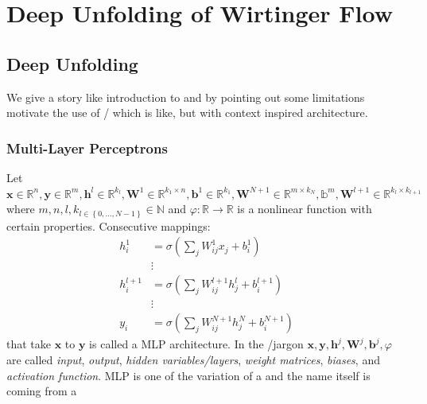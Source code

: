 \chapter{Deep Unfolding of Wirtinger Flow}\label{ch:deep_unfolding_of_wirtinger_flows}



\section{Deep Unfolding}

We give a story like introduction to \dl\cite{Goodfellow2016} and by pointing out some \dl limitations motivate the use of \du/\au\cite{Monga2019} 
which is \dl like, but with context inspired architecture.

\subsection{Multi-Layer Perceptrons}
Let $\boldsymbol{x} \in \mathbb{R}^n,\boldsymbol{y} \in \mathbb{R}^m, \boldsymbol{h}^l \in \mathbb{R}^{k_l}, \boldsymbol{W}^1 \in \mathbb{R}^{k_1 \times n}
, \boldsymbol{b}^1 \in \mathbb{R}^{k_1}, \boldsymbol{W}^{N+1} \in \mathbb{R}^{m \times k_N}, \mathbb{b}^m,\boldsymbol{W}^{l+1} \in \mathbb{R}^{k_l \times k_{l+1}}$ 
where $m,n,l,k_{l\in \left\{0,\ldots,N-1\right\}} \in \mathbb{N}$ and $\varphi \colon \mathbb{R} \to \mathbb{R}$ is a 
nonlinear function with certain properties. 
Consecutive mappings:
\begin{equation}
  \begin{split}
    h_i^{1}   &= \sigma \left( \sum_{j}^{} W_{ij}^{1}x_j + b_i^{1} \right)\\ 
              & \vdots\\
    h_i^{l+1} &= \sigma \left( \sum_{j}^{} W_{ij}^{l+1}h_j^l + b_i^{l+1} \right)\\
              & \vdots\\
    y_i^{}    &= \sigma \left( \sum_{j}^{} W_{ij}^{N+1}h_j^N + b_i^{N+1} \right)
  \end{split}
  \end{equation}
that take $\boldsymbol{x}$ to $\boldsymbol{y}$ is called a \ac{MLP}\cite{Bishop2006} architecture.
In the \ml/\dl jargon \cite{Goodfellow2016}\cite{ShalevShwartz2014} $\boldsymbol{x},\boldsymbol{y},\boldsymbol{h}^j,\boldsymbol{W}^j,\boldsymbol{b}^j,\varphi$ are called \emph{input}, \emph{output}, \emph{hidden variables/layers},
\emph{weight matrices}, \emph{biases}, and \emph{activation function}. \ac{MLP} is one of the variation of a \nn and the \nn name itself is coming from a 
